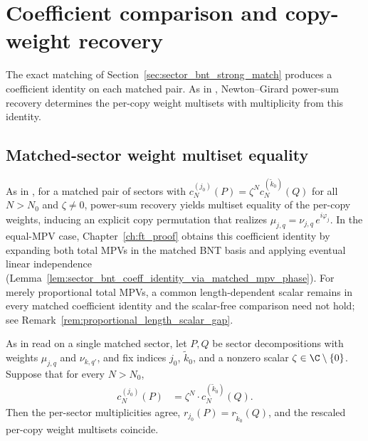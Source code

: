 \section{Coefficient comparison and copy-weight recovery}
\label{sec:sector_bnt_coeff_comparison}

The exact matching of Section~\ref{sec:sector_bnt_strong_match} produces a
coefficient identity on each matched pair. As in
\cite[Appendix~A]{Cirac2016MPDO_arXiv}, Newton--Girard power-sum recovery
determines the per-copy weight multisets with multiplicity from this identity.

\subsection{Matched-sector weight multiset equality}

As in \cite[Appendix~A]{Cirac2016MPDO_arXiv}, for a matched pair of sectors with
$c_N^{(j_0)}(P) = \zeta^N c_N^{(\tilde k_0)}(Q)$ for all $N > N_0$ and
$\zeta\ne0$, power-sum recovery yields multiset equality of the per-copy
weights, inducing an explicit copy permutation that realizes
$\mu_{j,q} = \nu_{j,q}\, e^{i\varphi_j}$.
In the equal-MPV case, Chapter~\ref{ch:ft_proof} obtains this coefficient
identity by expanding both total MPVs in the matched BNT basis and applying
eventual linear independence
(Lemma~\ref{lem:sector_bnt_coeff_identity_via_matched_mpv_phase}). For merely
proportional total MPVs, a common length-dependent scalar remains in every
matched coefficient identity and the scalar-free comparison need not hold; see
Remark~\ref{rem:proportional_length_scalar_gap}.

\begin{lemma}%
    \label{lem:sector_bnt_matched_sector_weight_multiset_eq}
    \leanok
    As in \cite[Appendix~A]{Cirac2016MPDO_arXiv} read on a single matched
    sector, let $P, Q$ be sector decompositions with weights $\mu_{j,q}$ and
    $\nu_{k,q'}$, and fix indices $j_0$, $\tilde k_0$, and a nonzero scalar
    $\zeta \in \C \setminus \{0\}$. Suppose that for every $N > N_0$,
    \begin{align}
        c_N^{(j_0)}(P)
         & = \zeta^N \cdot c_N^{(\tilde k_0)}(Q).
        \label{eq:bnt_matched_sector_coeff_identity}
    \end{align}
    Then the per-sector multiplicities agree, $r_{j_0}(P) = r_{\tilde k_0}(Q)$,
    and the rescaled per-copy weight multisets coincide.
\end{lemma}

